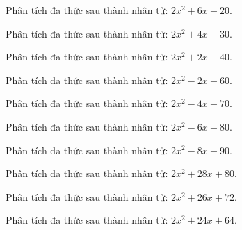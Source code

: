 \begin{bt}
	Phân tích đa thức sau thành nhân tử: $2 x^2 + 6 x - 20$.
\end{bt}
\begin{bt}
	Phân tích đa thức sau thành nhân tử: $2 x^2 + 4 x - 30$.
\end{bt}
\begin{bt}
	Phân tích đa thức sau thành nhân tử: $2 x^2 + 2 x - 40$.
\end{bt}
\begin{bt}
	Phân tích đa thức sau thành nhân tử: $2 x^2 - 2 x - 60$.
\end{bt}
\begin{bt}
	Phân tích đa thức sau thành nhân tử: $2 x^2 - 4 x - 70$.
\end{bt}
\begin{bt}
	Phân tích đa thức sau thành nhân tử: $2 x^2 - 6 x - 80$.
\end{bt}
\begin{bt}
	Phân tích đa thức sau thành nhân tử: $2 x^2 - 8 x - 90$.
\end{bt}
\begin{bt}
	Phân tích đa thức sau thành nhân tử: $2 x^2 + 28 x + 80$.
\end{bt}
\begin{bt}
	Phân tích đa thức sau thành nhân tử: $2 x^2 + 26 x + 72$.
\end{bt}
\begin{bt}
	Phân tích đa thức sau thành nhân tử: $2 x^2 + 24 x + 64$.
\end{bt}
